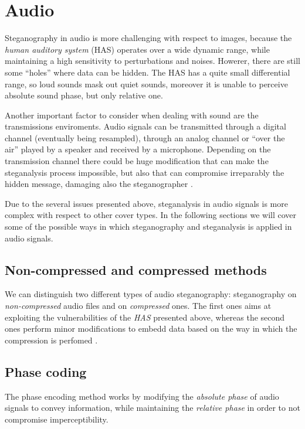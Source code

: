 \documentclass[../../main.tex]{subfiles}
\begin{document}
    

\section{Audio}
Steganography in audio is more challenging with respect to images, because
the \emph{human auditory system} (HAS) operates over a wide dynamic range,
while maintaining a high sensitivity to perturbations and noises.
Howerer, there are still some ``holes'' where data can be hidden.
The HAS has a quite small differential range, so loud sounds mask out quiet
sounds, moreover it is unable to perceive absolute sound phase, but only
relative one.

Another important factor to consider when dealing with sound are the
transmissions enviroments.
Audio signals can be transmitted through a digital channel (eventually being
resampled), through an analog channel or ``over the air'' played by a
speaker and received by a microphone.
Depending on the transmission channel there could be huge modification that
can make the steganalysis process impossible, but also that can compromise
irreparably the hidden message, damaging also the steganographer
\cite{techniques-data-hiding}.

Due to the several issues presented above, steganalysis in audio signals is
more complex with respect to other cover types.
In the following sections we will cover some of the possible ways in which
steganography and steganalysis is applied in audio signals.

\subsection{Non-compressed and compressed methods}
We can distinguish two different types of audio steganography: steganography
on \emph{non-compressed} audio files and on \emph{compressed} ones.
The first ones aims at exploiting the vulnerabilities of the \emph{HAS}
presented above, whereas the second ones perform minor modifications to
embedd data based on the way in which the compression is perfomed
\cite{review-audio-steganalysis}.

\subsection{Phase coding}
The phase encoding method works by modifying the \emph{absolute phase} of
audio signals to convey information, while maintaining the \emph{relative
phase} in order to not compromise imperceptibility.
\end{document}
